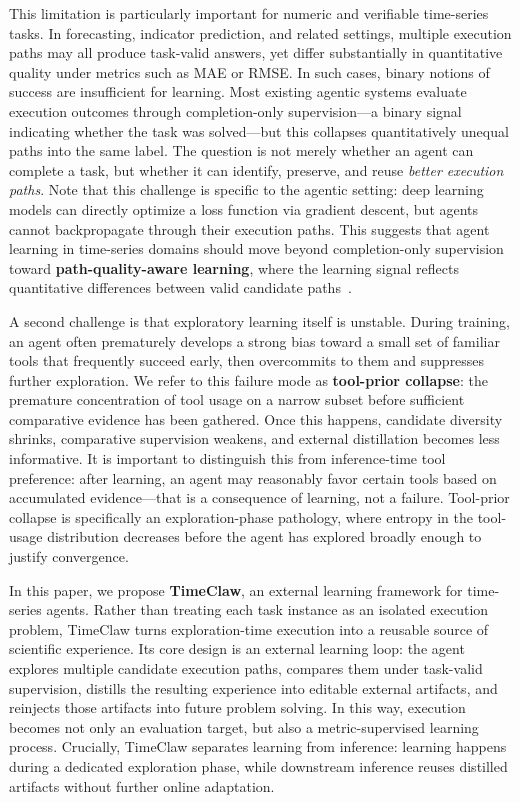 This limitation is particularly important for numeric and verifiable time-series tasks. In forecasting, indicator prediction, and related settings, multiple execution paths may all produce task-valid answers, yet differ substantially in quantitative quality under metrics such as MAE or RMSE. In such cases, binary notions of success are insufficient for learning. Most existing agentic systems evaluate execution outcomes through completion-only supervision---a binary signal indicating whether the task was solved---but this collapses quantitatively unequal paths into the same label. The question is not merely whether an agent can complete a task, but whether it can identify, preserve, and reuse \emph{better execution paths}. Note that this challenge is specific to the agentic setting: deep learning models can directly optimize a loss function via gradient descent, but agents cannot backpropagate through their execution paths. This suggests that agent learning in time-series domains should move beyond completion-only supervision toward \textbf{path-quality-aware learning}, where the learning signal reflects quantitative differences between valid candidate paths~\cite{timeart,tsagent,tssci,castr1}.

A second challenge is that exploratory learning itself is unstable. During training, an agent often prematurely develops a strong bias toward a small set of familiar tools that frequently succeed early, then overcommits to them and suppresses further exploration. We refer to this failure mode as \textbf{tool-prior collapse}: the premature concentration of tool usage on a narrow subset before sufficient comparative evidence has been gathered. Once this happens, candidate diversity shrinks, comparative supervision weakens, and external distillation becomes less informative. It is important to distinguish this from inference-time tool preference: after learning, an agent may reasonably favor certain tools based on accumulated evidence---that is a consequence of learning, not a failure. Tool-prior collapse is specifically an exploration-phase pathology, where entropy in the tool-usage distribution decreases before the agent has explored broadly enough to justify convergence.

In this paper, we propose \textbf{TimeClaw}, an external learning framework for time-series agents. Rather than treating each task instance as an isolated execution problem, TimeClaw turns exploration-time execution into a reusable source of scientific experience. Its core design is an external learning loop: the agent explores multiple candidate execution paths, compares them under task-valid supervision, distills the resulting experience into editable external artifacts, and reinjects those artifacts into future problem solving. In this way, execution becomes not only an evaluation target, but also a metric-supervised learning process. Crucially, TimeClaw separates learning from inference: learning happens during a dedicated exploration phase, while downstream inference reuses distilled artifacts without further online adaptation.

